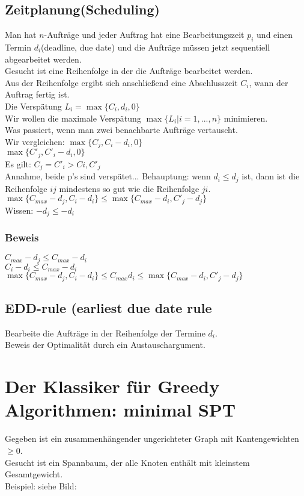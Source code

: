 \subsection{Zeitplanung(Scheduling)}
Man hat $n$-Aufträge und jeder Auftrag hat eine Bearbeitungszeit $p_i$ und einen Termin $d_i$(deadline, due date) und die Aufträge müssen jetzt sequentiell abgearbeitet werden.\\
Gesucht ist eine Reihenfolge in der die Aufträge bearbeitet werden.\\
Aus der Reihenfolge ergibt sich anschließend eine Abschlusszeit $C_i$, wann der Auftrag fertig ist.\\
Die Verspätung $L_i = \max \{C_i, d_i, 0\}$\\
Wir wollen die maximale Verspätung $\max\{L_i | i = 1,...,n\}$ minimieren.\\
Was passiert, wenn man zwei benachbarte Aufträge vertauscht. \\
Wir vergleichen: $\max\{C_j, C_i-d_i,0\}$\\
 $\max\{C'_j, C'_i-d_i,0\}$\\
 Es gilt: $C_j = C'_i > Ci,C'_j$\\
 Annahme, beide p's sind verspätet...
 Behauptung: wenn $d_i \leq d_j$ ist, dann ist die Reihenfolge $ij$ mindestens so gut wie die Reihenfolge $ji$.\\
 $\max \{C_{max}-d_j,C_{i}-d_i\} \leq \max	\{C_{max}-d_i,C'_j-d_j\}$\\
 Wissen: $-d_j \leq -d_i$
 \subsubsection{Beweis}
 $C_{max}-d_j \leq C_{max}-d_i$\\
 $C_i - d_i \leq C_{max}-d_i$\\
 $\max \{C_{max}-d_j,C_i-d_i\} \leq C_{max} d_i \leq \max \{C_{max}-d_i,C'_j-d_j\}$\\
 \subsection{EDD-rule (earliest due date rule}
 Bearbeite die Aufträge in der Reihenfolge der Termine $d_i$.\\
 Beweis der Optimalität durch ein Austauschargument.\\
 
 \section{Der Klassiker für Greedy Algorithmen: minimal SPT}
 Gegeben ist ein zusammenhängender ungerichteter Graph mit Kantengewichten $\geq 0$.\\
 Gesucht ist ein Spannbaum, der alle Knoten enthält mit kleinstem Gesamtgewicht.\\
 Beispiel: siehe Bild:\\
